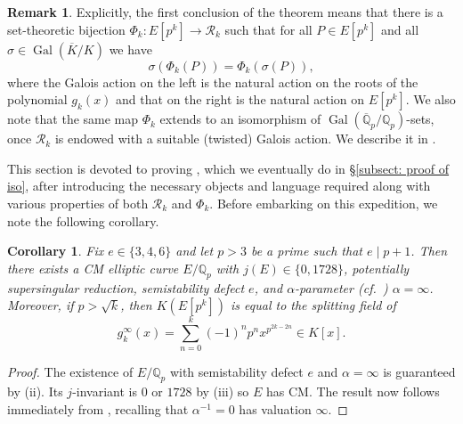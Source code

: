 \documentclass{amsart}
\newcommand{\op}[1]{\operatorname{#1}}
\newcommand{\Qp}{\mathbb{Q}_p}
\newtheorem{corollary}[theorem]{Corollary}
\theoremstyle{definition}
\newtheorem{remark}[theorem]{Remark}
\newcommand{\Q}{\mathbb{Q}}
\newcommand{\Gal}{\operatorname{Gal}}
\numberwithin{theorem}{section}
\numberwithin{equation}{section}
\begin{document}
\begin{remark}\label{rmk: twisted Galois action of Phi}
    Explicitly, the first conclusion of the theorem means that there is a set-theoretic bijection $\Phi_k : E[p^k] \to \mathcal{R}_k$ such that for all $P \in E[p^k]$ and all $\sigma \in \op{Gal}(\overline{K}/K)$ we have
    \[
    \sigma(\Phi_k(P)) = \Phi_k(\sigma(P)),
    \]
    where the Galois action on the left is the natural action on the roots of the polynomial $g_k(x)$ and that on the right is the natural action on $E[p^k]$. We also note that the same map $\Phi_k$ extends to an isomorphism of $\Gal(\overline{\Q}_p/\Q_p)$-sets, once $\mathcal{R}_k$ is endowed with a suitable (twisted) Galois action. We describe it in .
\end{remark}

This section is devoted to proving , which we eventually do in \S\ref{subsect: proof of iso}, after introducing the necessary objects and language required along with various properties of both $\mathcal{R}_k$ and $\Phi_k$. 
Before embarking on this expedition, we note the following corollary.


\begin{corollary}\label{cor: splitting field in limit case}
    Fix $e \in \{3,4,6\}$ and let $p>3$ be a prime such that $e \mid p+1$. Then there exists a CM elliptic curve $E/\Qp$ with $j(E) \in \{0,1728\}$, potentially supersingular reduction, semistability defect $e$, and $\alpha$-parameter (cf.~) $\alpha=\infty$. Moreover, if $p> \sqrt{k}$, then $K(E[p^k])$ is equal to the splitting field of
    \[
    g_k^{\infty}(x)= \sum_{n=0}^k (-1)^np^n x^{p^{2k-2n}} \in K[x].
    \]
\end{corollary}

\begin{proof}
    The existence of $E/\Q_p$ with semistability defect $e$ and $\alpha=\infty$ is guaranteed by (ii). Its $j$-invariant is $0$ or $1728$ by (iii) so $E$ has CM. The result now follows immediately from , recalling that $\alpha^{-1}=0$ has valuation $\infty$.
\end{proof}
\end{document}
